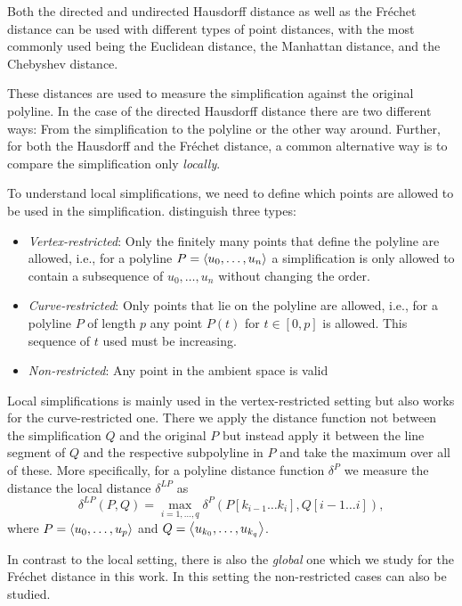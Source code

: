 Both the directed and undirected Hausdorff distance as well as the Fréchet distance can be used with different types of point distances, with the most commonly used being the Euclidean distance, the Manhattan distance, and the Chebyshev distance.

These distances are used to measure the simplification against the original polyline. In the case of the directed Hausdorff distance there are two different ways: From the simplification to the polyline or the other way around. 
Further, for both the Hausdorff and the Fréchet distance, a common alternative way is to compare the simplification only \emph{locally}.

To understand local simplifications, we need to define which points are allowed to be used in the simplification. \citeauthor{global_curve_simplification} distinguish three types:
\begin{itemize}
  \item \emph{Vertex-restricted}: Only the finitely many points that define the polyline are allowed, i.e., for a polyline \(P = \left\langle u_0, \dots, u_n\right\rangle\) a simplification is only allowed to contain a subsequence of \(u_0, \dots, u_n\) without changing the order.
	\item \emph{Curve-restricted}: Only points that lie on the polyline are allowed, i.e., for a polyline \(P\) of length \(p\) any point \(P(t)\) for \(t \in [0, p]\) is allowed. This sequence of \(t\) used must be increasing.
	\item \emph{Non-restricted}: Any point in the ambient space is valid 
\end{itemize}

Local simplifications is mainly used in the vertex-restricted setting but also works for the curve-restricted one. There we apply the distance function not between the simplification \(Q\) and the original \(P\) but instead apply it between the line segment of \(Q\) and the respective subpolyline in \(P\) and take the maximum over all of these. More specifically, for a polyline distance function \(\delta^P\) we measure the distance the local distance \(\delta^{LP}\) as 
\[\delta^{LP}(P, Q) = \max_{i = 1, \dots, q} \delta^P(P[k_{i-1}\dots k_i], Q[i-1 \dots i]),\]
where \(P = \left\langle u_0, \dots, u_p\right\rangle\) and \(Q = \left\langle u_{k_0}, \dots, u_{k_q}\right\rangle\).

In contrast to the local setting, there is also the \emph{global} one which we study for the Fréchet distance in this work. In this setting the non-restricted cases can also be studied.

